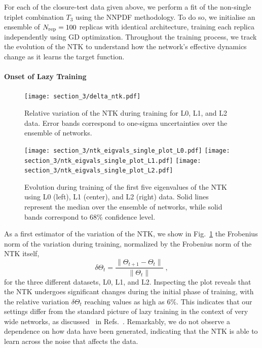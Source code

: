 For each of the closure-test data given above, we perform a fit of the
non-single triplet combination $T_3$ using the NNPDF methodology. To do so, we
initialise an ensemble of $N_{\rm rep} = 100$ replicas with identical architecture,
training each replica independently using GD optimization. Throughout the
training process, we track the evolution of the NTK to understand how the
network's effective dynamics change as it learns the target function.

\paragraph{Onset of Lazy Training} 
\begin{figure}[t]
  \centering
  \texttt{[image: section\_3/delta\_ntk.pdf]}
  \caption{Relative variation of the NTK during training for L0, L1, and
  L2 data. Error bands correspond to one-sigma uncertainties over the ensemble
  of networks.}
  \label{fig:NTKTime}
\end{figure}

\begin{figure}[t]
  \centering
  \texttt{[image: section\_3/ntk\_eigvals\_single\_plot\_L0.pdf]}
  \texttt{[image: section\_3/ntk\_eigvals\_single\_plot\_L1.pdf]}
  \texttt{[image: section\_3/ntk\_eigvals\_single\_plot\_L2.pdf]} 
  \caption{Evolution during training of the first five eigenvalues of the NTK
  using L0 (left), L1 (center), and L2 (right) data. Solid lines represent the
  median over the ensemble of networks, while solid bands correspond to 68\%
  confidence level.}
  \label{fig:NTKEigvalsTime}
\end{figure}

As a first estimator of the variation of the NTK, we show in
Fig.~\ref{fig:NTKTime} the Frobenius norm of the variation during training,
normalized by the Frobenius norm of the NTK itself, 
\begin{equation}
\delta \Theta_t = \frac{\lVert \Theta_{t+1} - \Theta_t \rVert}{\lVert \Theta_t \rVert} \;,
\label{eq:DeltaNTK}
\end{equation}
for the three different datasets, L0, L1, and L2. Inspecting the plot reveals that
the NTK undergoes significant changes during the initial phase of training, with
the relative variation $\delta \Theta_t$ reaching values as high as $6\%$. This
indicates that our settings differ from the standard picture of lazy training in
the context of very wide networks, as discussed \eg~in
Refs.~\cite{jacot2018neural,Roberts:2021fes,lee2019wide}. Remarkably, we do not
observe a dependence on how data have been generated, indicating that the NTK is
able to learn across the noise that affects the data. 

